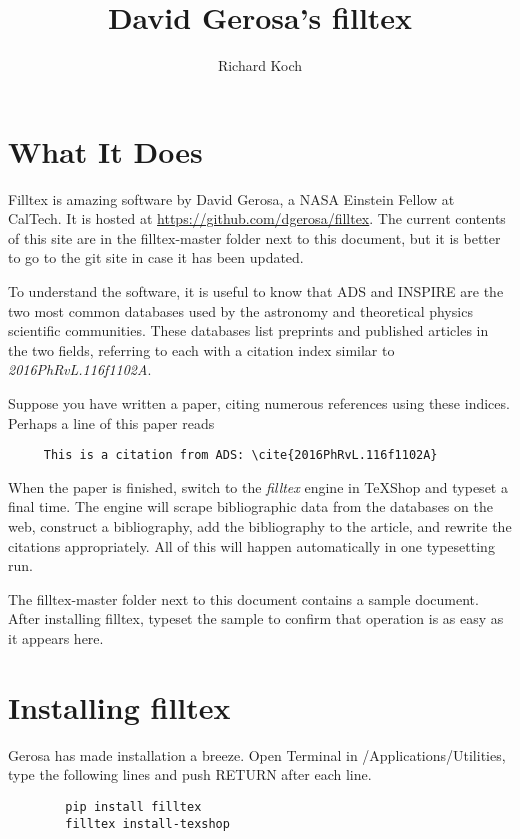 \documentclass[11pt, oneside]{amsart}
\title{David Gerosa's filltex}
\author{Richard Koch}
\begin{document}
\maketitle
\vspace{-.3in}
\section{What It Does}

Filltex is amazing software by David Gerosa, a NASA Einstein Fellow at CalTech. It is hosted at
\url{https://github.com/dgerosa/filltex}. The current contents of this site are in the filltex-master folder next to this document, but it is better to go to the git site in case it has been updated.

To understand the software, it is useful to know that ADS and INSPIRE are the two most common databases used by the astronomy and theoretical physics scientific communities. These databases list preprints and published articles in the two fields, referring to each with a citation index similar to {\em 2016PhRvL.116f1102A}. 

Suppose you have written a paper, citing numerous references using these indices. Perhaps a line of this paper reads
\begin{verbatim}
     This is a citation from ADS: \cite{2016PhRvL.116f1102A}
\end{verbatim}
When the paper is finished, switch to the {\em filltex} engine in TeXShop and typeset a final time. The engine will scrape bibliographic data from the databases on the web, construct a bibliography, add the bibliography to the article, and rewrite the citations appropriately. All of this will happen automatically in one typesetting run.

The filltex-master folder next to this document contains a  sample document. After installing filltex,  typeset the sample to confirm that operation is as easy as it appears here.

\section{Installing filltex}

Gerosa has made installation a breeze. Open Terminal in /Applications/Utilities, type the following lines and push RETURN after each line.
\begin{verbatim}
        pip install filltex
        filltex install-texshop
\end{verbatim} 
\end{document}
